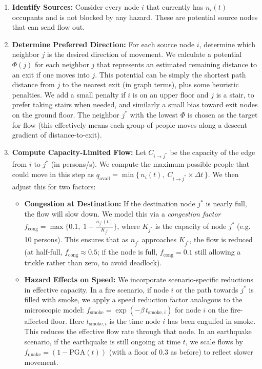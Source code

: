 \documentclass[11pt,a4paper]{article}
\begin{document}
\begin{enumerate}
    \item \textbf{Identify Sources:} Consider every node $i$ that currently has $n_i(t)$ occupants and is not blocked by any hazard. These are potential source nodes that can send flow out.
    \item \textbf{Determine Preferred Direction:} For each source node $i$, determine which neighbor $j$ is the desired direction of movement. We calculate a potential $\Phi(j)$ for each neighbor $j$ that represents an estimated remaining distance to an exit if one moves into $j$. This potential can be simply the shortest path distance from $j$ to the nearest exit (in graph terms), plus some heuristic penalties. We add a small penalty if $i$ is on an upper floor and $j$ is a stair, to prefer taking stairs when needed, and similarly a small bias toward exit nodes on the ground floor. The neighbor $j^*$ with the lowest $\Phi$ is chosen as the target for flow (this effectively means each group of people moves along a descent gradient of distance-to-exit).
    \item \textbf{Compute Capacity-Limited Flow:} Let $C_{i\to j^*}$ be the capacity of the edge from $i$ to $j^*$ (in persons/s). We compute the maximum possible people that could move in this step as $q_{\text{avail}} = \min\{\,n_i(t),\; C_{i\to j^*} \times \Delta t\,\}$. We then adjust this for two factors:
        \begin{itemize}
            \item \textbf{Congestion at Destination:} If the destination node $j^*$ is nearly full, the flow will slow down. We model this via a \emph{congestion factor} $f_{\text{cong}} = \max\{0.1,\; 1 - \frac{n_{j^*}(t)}{K_{j^*}}\}$, where $K_{j^*}$ is the capacity of node $j^*$ (e.g. 10 persons). This ensures that as $n_{j^*}$ approaches $K_{j^*}$, the flow is reduced (at half-full, $f_{\text{cong}}\approx0.5$; if the node is full, $f_{\text{cong}}=0.1$ still allowing a trickle rather than zero, to avoid deadlock). 
            \item \textbf{Hazard Effects on Speed:} We incorporate scenario-specific reductions in effective capacity. In a fire scenario, if node $i$ or the path towards $j^*$ is filled with smoke, we apply a speed reduction factor analogous to the microscopic model: $f_{\text{smoke}} = \exp(-\beta\, t_{\text{smoke},i})$ for node $i$ on the fire-affected floor. Here $t_{\text{smoke},i}$ is the time node $i$ has been engulfed in smoke. This reduces the effective flow rate through that node. In an earthquake scenario, if the earthquake is still ongoing at time $t$, we scale flows by $f_{\text{quake}} = (1 - \text{PGA}(t))$ (with a floor of 0.3 as before) to reflect slower movement.

\end{itemize}
\end{enumerate}
\end{document}
